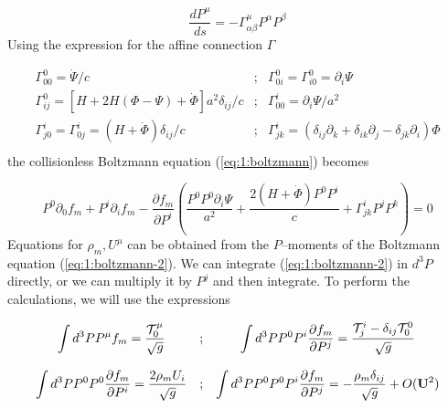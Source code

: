 \begin{equation}
\label{eq:1:geodesic}
\frac{dP^\mu}{ds} = -\Gamma^\mu_{\alpha\beta}P^\alpha P^\beta
\end{equation}
%
Using the expression for the affine connection $\Gamma$

\begin{equation}
\label{eq:1:connection}
\begin{matrix}
\Gamma_{00}^0 = \dot{\Psi}/c & ; & \Gamma_{0i}^0=\Gamma_{i0}^0 = \partial_i\Psi \\  
\Gamma_{ij}^0 = [H+2H(\Phi-\Psi)+\dot{\Phi}]a^2\delta_{ij}/c & ; & \Gamma_{00}^i = \partial_i \Psi/a^2 \\
\Gamma^i_{j0} = \Gamma^i_{0j} = (H+\dot{\Phi})\delta_{ij}/c & ; & \Gamma_{jk}^i = (\delta_{ij}\partial_k+\delta_{ik}\partial_j-\delta_{jk}\partial_i)\Phi\\
\end{matrix}
\end{equation}
%
the collisionless Boltzmann equation (\ref{eq:1:boltzmann}) becomes

\begin{equation}
\label{eq:1:boltzmann-2}
P^0\partial_0 f_m + P^i\partial_i f_m - \frac{\partial f_m}{\partial P^i}\left(\frac{P^0P^0\partial_i\Psi}{a^2} + \frac{2(H+\dot{\Phi})P^0P^i}{c} + \Gamma_{jk}^i P^jP^k \right) = 0
\end{equation}
%
Equations for $\rho_m,U^\mu$ can be obtained from the $P$--moments of the Boltzmann equation (\ref{eq:1:boltzmann-2}). We can integrate (\ref{eq:1:boltzmann-2}) in $d^3P$ directly, or we can multiply it by $P^j$ and then integrate. To perform the calculations, we will use the expressions

\begin{equation}
\label{eq:1:boltzmann-mom}
\begin{matrix}
\displaystyle \int d^3P P^\mu f_m = \frac{\mathcal{T}^\mu_0}{\sqrt{g}} & ; & \displaystyle \int d^3P P^0 P^i \frac{\partial f_m}{\partial P^j} = \frac{\mathcal{T}^i_j-\delta_{ij}\mathcal{T}^0_0}{\sqrt{g}} \\ \\
\displaystyle \int d^3P P^0P^0 \frac{\partial f_m}{\partial P^i} = \frac{2\rho_m U_i}{\sqrt{g}} & ; & \displaystyle \int d^3P P^0P^0P^i \frac{\partial f_m}{\partial P^j} = -\frac{\rho_m\delta_{ij}}{\sqrt{g}} + O(\mathbf{U}^2) \\ \\ 
\end{matrix}
\end{equation}

